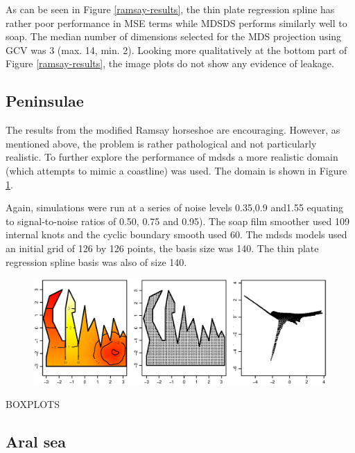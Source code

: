 \documentclass[useAMS,referee, usegraphicx]{biom}
\begin{document}
As can be seen in Figure \ref{ramsay-results}, the thin plate regression spline has rather poor performance in MSE terms while MDSDS performs similarly well to soap. The median number of dimensions selected for the MDS projection using GCV was 3 (max. 14, min. 2). Looking more qualitatively at the bottom part of Figure \ref{ramsay-results}, the image plots do not show any evidence of leakage.


\subsection{Peninsulae}

The results from the modified Ramsay horseshoe are encouraging. However, as mentioned above, the problem is rather pathological and not particularly realistic. To further explore the performance of mdsds a more realistic domain (which attempts to mimic a coastline) was used. The domain is shown in Figure \ref{wt2-plot}.

Again, simulations were run at a series of noise levels 0.35,0.9 and1.55 equating to signal-to-noise ratios of 0.50, 0.75 and 0.95). The soap film smoother used 109 internal knots and the cyclic boundary smooth used 60. The mdsds models used an initial grid of 126 by 126 points, the basis size was 140. The thin plate regression spline basis was also of size 140.

\begin{figure}
\centering
\includegraphics[width=\textwidth]{examples/wt2/wt2-plot.eps} \\
\caption{}
\label{wt2-plot}
\end{figure}


BOXPLOTS


\subsection{Aral sea}

\end{document}
